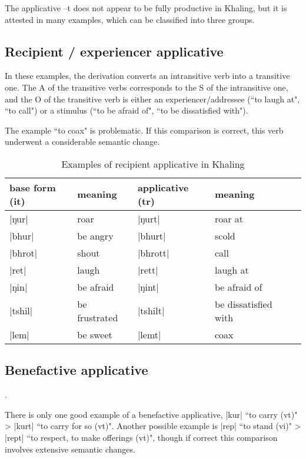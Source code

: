 \documentclass[oldfontcommands,oneside,a4paper,11pt]{article}
\newcommand{\ipa}[1]{{\phon #1}} %
\newcommand{\dhatu}[1]{|\ipa{#1}|}
\begin{document}
The applicative \ipa{--t} does not appear to be fully productive in Khaling, but it is attested in many examples, which can be classified into three groups. 

\subsection{Recipient / experiencer applicative}

In these examples, the derivation converts an intransitive verb into a transitive one. The A of the transitive verbs corresponds to the S of the intransitive one, and the O of the transitive verb is either an experiencer/addressee (``to laugh at", ``to call") or a stimulus (``to be afraid of", ``to be dissatisfied with").

The example ``to coax" is problematic.  If this comparison is correct, this verb underwent a considerable semantic change.
\begin{table}[H]
\caption{Examples of recipient applicative in Khaling} \label{tab:recipient.appl}
\begin{tabular}{lllll}
\toprule
base form (it) & meaning & applicative (tr) & meaning \\
\midrule
\dhatu{ŋur} & roar & \dhatu{ŋurt} &roar at\\
\dhatu{bhur} & be angry & \dhatu{bhurt} &scold\\
\dhatu{bhrot} & shout & \dhatu{bhrott} & call\\
\dhatu{ret} & laugh  & \dhatu{rett} & laugh at\\
\dhatu{ŋin} & be afraid  & \dhatu{ŋint} & be afraid of\\
\dhatu{tshil} & be frustrated  & \dhatu{tshilt} & be dissatisfied with\\
\dhatu{lem} & be sweet  & \dhatu{lemt} & coax\\
\bottomrule
\end{tabular}
\end{table}

\subsection{Benefactive applicative}. 

There is only one good example of a benefactive applicative, \dhatu{kur} ``to carry (vt)" > \dhatu{kurt} ``to carry for so (vt)". Another possible example is \dhatu{rep} ``to stand (vi)" > \dhatu{rept} ``to respect, to make offerings (vt)", though if correct this comparison involves extensive semantic changes.
\end{document}
